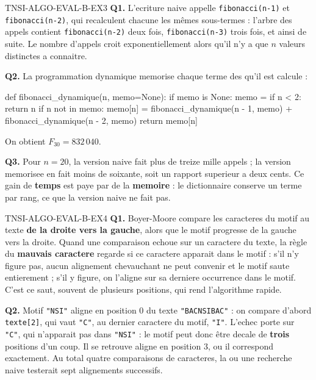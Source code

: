 \begin{corrige}{TNSI-ALGO-EVAL-B-EX3}
\textbf{Q1.} L'ecriture naive appelle \lstinline{fibonacci(n-1)} et \lstinline{fibonacci(n-2)},
qui recalculent chacune les mêmes sous-termes : l'arbre des appels contient
\lstinline{fibonacci(n-2)} deux fois, \lstinline{fibonacci(n-3)} trois fois, et ainsi de
suite. Le nombre d'appels croit exponentiellement alors qu'il n'y a que $n$ valeurs
distinctes a connaitre.

\textbf{Q2.} La programmation dynamique memorise chaque terme des qu'il est calcule :

\begin{python}
def fibonacci_dynamique(n, memo=None):
    if memo is None:
        memo = {}
    if n < 2:
        return n
    if n not in memo:
        memo[n] = fibonacci_dynamique(n - 1, memo) + fibonacci_dynamique(n - 2, memo)
    return memo[n]
\end{python}
On obtient $F_{30} = 832\,040$.

\textbf{Q3.} Pour $n=20$, la version naive fait plus de treize mille appels ; la version
memorisee en fait moins de soixante, soit un rapport superieur a deux cents. Ce gain de
\textbf{temps} est paye par de la \textbf{memoire} : le dictionnaire conserve un terme par
rang, ce que la version naive ne fait pas.
\end{corrige}

\begin{corrige}{TNSI-ALGO-EVAL-B-EX4}
\textbf{Q1.} Boyer-Moore compare les caracteres du motif au texte \textbf{de la droite vers
la gauche}, alors que le motif progresse de la gauche vers la droite. Quand une comparaison
echoue sur un caractere du texte, la règle du \textbf{mauvais caractere} regarde si ce
caractere apparait dans le motif : s'il n'y figure pas, aucun alignement chevauchant ne peut
convenir et le motif saute entierement ; s'il y figure, on l'aligne sur sa derniere
occurrence dans le motif. C'est ce saut, souvent de plusieurs positions, qui rend
l'algorithme rapide.

\textbf{Q2.} Motif \lstinline{"NSI"} aligne en position $0$ du texte
\lstinline{"BACNSIBAC"} : on compare d'abord \lstinline{texte[2]}, qui vaut \lstinline{"C"},
au dernier caractere du motif, \lstinline{"I"}. L'echec porte sur \lstinline{"C"}, qui
n'apparait pas dans \lstinline{"NSI"} : le motif peut donc être decale de \textbf{trois}
positions d'un coup. Il se retrouve aligne en position $3$, ou il correspond exactement. Au
total quatre comparaisons de caracteres, la ou une recherche naive testerait sept
alignements successifs.
\end{corrige}

